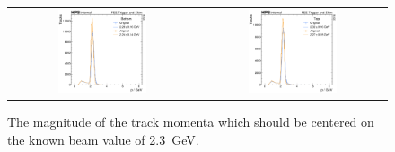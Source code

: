 \begin{figure}
  \centering
  \begin{tabular}{cc}
    \includegraphics[width=0.49\textwidth]{figures/hps/alignment/p_bottom.pdf}
    &
    \includegraphics[width=0.49\textwidth]{figures/hps/alignment/p_top.pdf}
  \end{tabular}
  \caption{The magnitude of the track momenta which should be centered on
  the known beam value of \qty{2.3}{\giga\electronvolt}.}
  \label{fig:example-align-p}
\end{figure}
